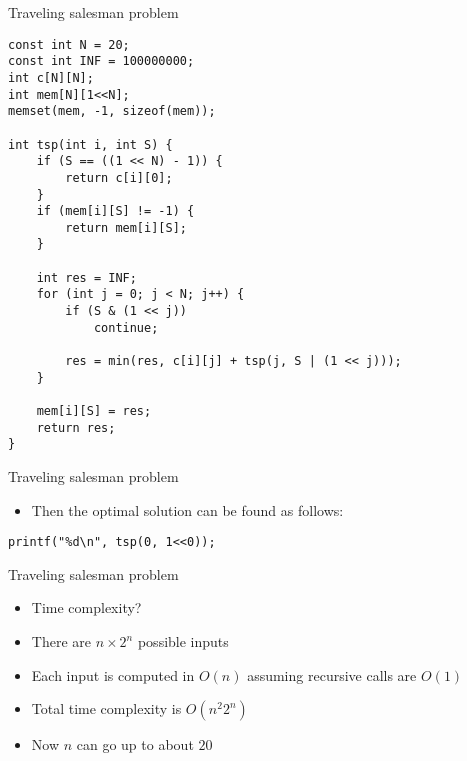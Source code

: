 \documentclass[12pt,t]{beamer}
\newcommand{\bi}{\begin{itemize}}
\newcommand{\ei}{\end{itemize}}
\begin{document}
\begin{frame}[fragile]{Traveling salesman problem}
    \begin{verbatim}
const int N = 20;
const int INF = 100000000;
int c[N][N];
int mem[N][1<<N];
memset(mem, -1, sizeof(mem));

int tsp(int i, int S) {
    if (S == ((1 << N) - 1)) {
        return c[i][0];
    }
    if (mem[i][S] != -1) {
        return mem[i][S];
    }

    int res = INF;
    for (int j = 0; j < N; j++) {
        if (S & (1 << j))
            continue;

        res = min(res, c[i][j] + tsp(j, S | (1 << j)));
    }

    mem[i][S] = res;
    return res;
}
    \end{verbatim}
\end{frame}

\begin{frame}[fragile]{Traveling salesman problem}
    \vspace{30pt}
    \bi
\item Then the optimal solution can be found as follows:
    \ei

    \vspace{20pt}
    \begin{verbatim}
printf("%d\n", tsp(0, 1<<0));
    \end{verbatim}
\end{frame}

\begin{frame}{Traveling salesman problem}
    \vspace{30pt}
    \bi
        \item Time complexity? \pause
        \vspace{10pt}
        \item There are $n \times 2^n$ possible inputs
        \item Each input is computed in $O(n)$ assuming recursive calls are $O(1)$
        \item Total time complexity is $O(n^2 2^n)$
            \vspace{10pt}
        \item Now $n$ can go up to about $20$
    \ei
\end{frame}
\end{document}
